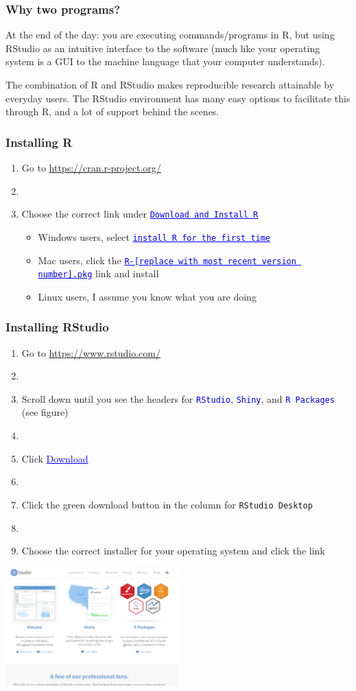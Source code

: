 \documentclass[11pt]{beamer}
\newcommand{\myframe}[1]{\begin{frame} \frametitle{#1}}
\newenvironment{spaceitemize}
{ \begin{itemize}
    \setlength{\itemsep}{10pt}
    \setlength{\parskip}{0pt}
    \setlength{\parsep}{0pt}     }
{ \end{itemize}                  }
\begin{document}
\myframe{Why two programs?}
At the end of the day: you are executing commands/programs in R, but using RStudio as an intuitive interface to the software (much like your operating system is a GUI to the machine language that your computer understands).

The combination of R and RStudio makes reproducible research attainable by everyday users. The RStudio environment has many easy options to facilitate this through R, and a lot of support behind the scenes.


\end{frame}

\myframe{Installing R}
\begin{enumerate}
\item Go to \url{https://cran.r-project.org/}
\item[]
\item Choose the correct link under \textcolor{blue}{\underline{\texttt{Download and Install R}}}
\begin{spaceitemize}
\item Windows users, select \textcolor{blue}{\underline{\texttt{install R for the first time}}}
\item Mac users, click the \textcolor{blue}{\underline{\texttt{R-[replace with most recent version number].pkg}}} link and install
\item Linux users, I assume you know what you are doing
\end{spaceitemize}
\end{enumerate}

\end{frame}

\myframe{Installing RStudio}
\begin{enumerate}
\item Go to \url{https://www.rstudio.com/}
\item[]
\item Scroll down until you see the headers for \textcolor{blue}{\texttt{RStudio}}, \textcolor{blue}{\texttt{Shiny}}, and \textcolor{blue}{\texttt{R Packages}}  (see figure)
\item[]
\item Click \textcolor{blue}{\underline{Download}}
\item[] 
\item Click the green download button in the column for \texttt{RStudio Desktop}
\item[]
\item Choose the correct installer for your operating system and click the link
\end{enumerate}
\centering
\includegraphics[width = 0.5\textwidth]{figs/rstudio_download.png}
\end{frame}
\end{document}
